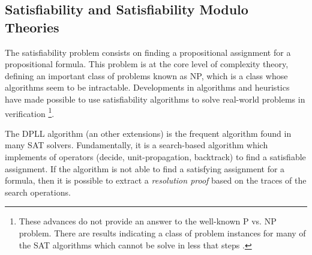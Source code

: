 \subsection{Satisfiability and Satisfiability Modulo Theories}
 
The satisfiability problem consists on finding a 
propositional assignment for a propositional formula. 
This problem is at the core level of complexity theory, 
defining an important class of problems known as 
NP, which is a class whose
algorithms seem to be intractable.
Developments in algorithms and heuristics \cite{10.5555/2898950, 
935565} have made possible to use satisfiability algorithms 
to solve real-world problems in verification \footnote{These
advances do not provide an answer to the well-known P vs. NP
problem. There are results indicating a class of problem instances
for many of the SAT algorithms which cannot be solve in less that
   steps \cite{10.5555/2898950}.
  }.

The DPLL algorithm \cite{10.1145/368273.368557} 
(an other extensions) is the frequent algorithm
found in many SAT solvers. Fundamentally, it is a search-based algorithm
which implements of operators (decide, unit-propagation, backtrack)
to find a satisfiable assignment. If the algorithm is not able to
find a satisfying assignment for a formula, then it is possible to 
extract a \emph{resolution proof} based on the traces of the search
operations.

